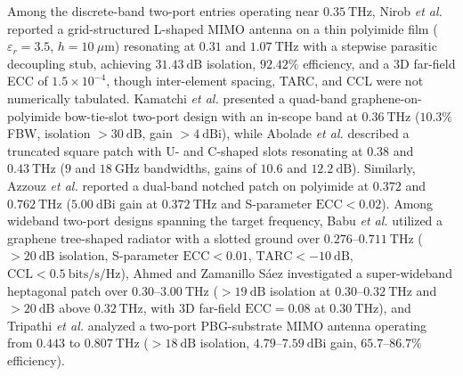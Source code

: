 \documentclass[referee,pdflatex,sn-mathphys-ay]{sn-jnl}
\begin{document}
Among the discrete-band two-port entries operating near \(0.35~\mathrm{THz}\), Nirob \textit{et al.} \citep{nirob2025} reported a grid-structured L-shaped MIMO antenna on a thin polyimide film ($\varepsilon_r = 3.5$, $h = 10~\mu\mathrm{m}$) resonating at \(0.31\) and \(1.07~\mathrm{THz}\) with a stepwise parasitic decoupling stub, achieving \(31.43~\mathrm{dB}\) isolation, \(92.42\%\) efficiency, and a 3D far-field ECC of \(1.5\times 10^{-4}\), though inter-element spacing, TARC, and CCL were not numerically tabulated. Kamatchi \textit{et al.} \citep{kavitha2025} presented a quad-band graphene-on-polyimide bow-tie-slot two-port design with an in-scope band at \(0.36~\mathrm{THz}\) (\(10.3\%\) FBW, isolation \(>30~\mathrm{dB}\), gain \(>4~\mathrm{dBi}\)), while Abolade \textit{et al.} \citep{abolade2026} described a truncated square patch with U- and C-shaped slots resonating at \(0.38\) and \(0.43~\mathrm{THz}\) (\(9\) and \(18~\mathrm{GHz}\) bandwidths, gains of \(10.6\) and \(12.2~\mathrm{dB}\)). Similarly, Azzouz \textit{et al.} \citep{azzouz2025} reported a dual-band notched patch on polyimide at \(0.372\) and \(0.762~\mathrm{THz}\) ($5.00~\mathrm{dBi}$ gain at $0.372~\mathrm{THz}$ and S-parameter $\mathrm{ECC} < 0.02$). Among wideband two-port designs spanning the target frequency, Babu \textit{et al.} \citep{babu2021} utilized a graphene tree-shaped radiator with a slotted ground over \(0.276\)--\(0.711~\mathrm{THz}\) ($>20~\mathrm{dB}$ isolation, S-parameter $\mathrm{ECC} < 0.01$, $\mathrm{TARC} < -10~\mathrm{dB}$, $\mathrm{CCL} < 0.5~\mathrm{bits/s/Hz}$), Ahmed and Zamanillo S\'aez \citep{ahmed2023} investigated a super-wideband heptagonal patch over \(0.30\)--\(3.00~\mathrm{THz}\) ($>19~\mathrm{dB}$ isolation at $0.30$--$0.32~\mathrm{THz}$ and $>20~\mathrm{dB}$ above $0.32~\mathrm{THz}$, with 3D far-field $\mathrm{ECC} = 0.08$ at $0.30~\mathrm{THz}$), and Tripathi \textit{et al.} \citep{tripathi2023} analyzed a two-port PBG-substrate MIMO antenna operating from \(0.443\) to \(0.807~\mathrm{THz}\) ($>18~\mathrm{dB}$ isolation, $4.79$--$7.59~\mathrm{dBi}$ gain, $65.7$--$86.7\%$ efficiency).
\end{document}
